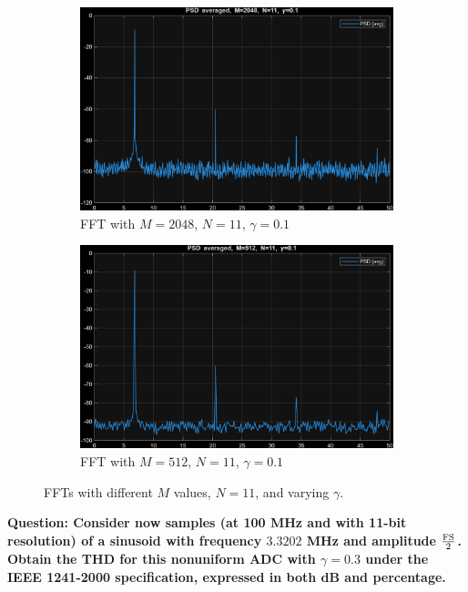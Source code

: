 \begin{figure}[H]
  \begin{subfigure}[t]{0.45\textwidth}
    \centering
    \includegraphics[width=\linewidth,height=0.28\textheight,keepaspectratio]{img/task5_5_3.png}
    \caption{FFT with $M=2048$, $N=11$, $\gamma=0.1$}
  \end{subfigure}\hfill
  \begin{subfigure}[t]{0.45\textwidth}
    \centering
    \includegraphics[width=\linewidth,height=0.28\textheight,keepaspectratio]{img/task5_5_6.png}
    \caption{FFT with $M=512$, $N=11$, $\gamma=0.1$}
  \end{subfigure}

  \caption{FFTs with different $M$ values, $N=11$, and varying $\gamma$.}
  \label{fig:task5_5}
\end{figure}

\vspace{1cm}
\textbf{Question: Consider now samples (at 100 MHz and with 11-bit resolution) of a sinusoid with frequency $3.3202$ MHz and amplitude $\frac{\rm FS}{2}$. Obtain the THD for this nonuniform ADC with $\gamma = 0.3$ under the IEEE 1241-2000 specification, expressed in both dB and percentage.
}
\vspace{0.5cm}

